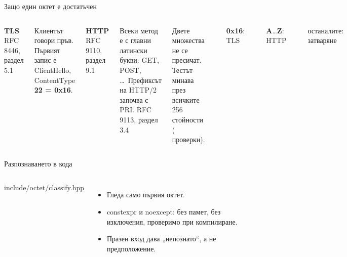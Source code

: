 \documentclass[aspectratio=169, 11pt]{beamer}
\newcommand{\code}[1]{{\ttfamily #1}}
\newcommand{\hex}[1]{{\ttfamily\bfseries #1}}
\newcommand{\src}[1]{{\color{muted}\scriptsize #1}}
\begin{document}
\begin{frame}{Защо един октет е достатъчен}
\begin{columns}[T]
\textbf{TLS} \src{RFC 8446, раздел 5.1}\par
Клиентът говори пръв. Първият запис е ClientHello, ContentType \hex{22 = 0x16}.\par\medskip
\textbf{HTTP} \src{RFC 9110, раздел 9.1}\par
Всеки метод е с главни латински букви: \code{GET}, \code{POST}, \dots\ Префиксът на
HTTP/2 започва с \code{PRI}. \src{RFC 9113, раздел 3.4}\par\medskip
Двете множества не се пресичат. Тестът минава през всичките 256 стойности
(\checksClassify{} проверки).
\centering
{}\par
{\scriptsize
\textcolor{tls}{\rule{0.7em}{0.7em}} \hex{0x16}: TLS\quad
\textcolor{clear}{\rule{0.7em}{0.7em}} \hex{A}\dots\hex{Z}: HTTP\quad
\textcolor{unknownbg}{\rule{0.7em}{0.7em}} останалите: затваряне\par}
\end{columns}
\end{frame}

\begin{frame}[fragile]{Разпознаването в кода}
\begin{columns}[T]
\vspace{-0.6em}

\src{include/octet/classify.hpp}\par\medskip
\begin{itemize}
\item Гледа само първия октет.
\item \code{constexpr} и \code{noexcept}: без памет, без изключения, проверимо при компилиране.
\item Празен вход дава „непознато“, а не предположение.
\end{itemize}
\end{columns}
\end{frame}
\end{document}
